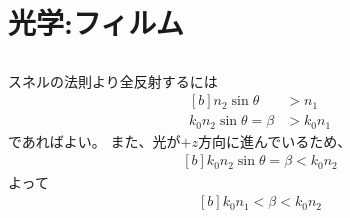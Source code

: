 \documentclass[../ap_2013.tex]{subfiles}
\begin{document}
\setcounter{chapter}{2}
\chapter{光学:フィルム}
\section{}
スネルの法則より全反射するには
\begin{equation}\begin{aligned}[b]
    n_2\sin\theta &> n_1\\
    k_0n_2\sin\theta = \beta &> k_0n_1
\end{aligned}\end{equation}
であればよい。
また、光が\(+z\)方向に進んでいるため、
\begin{equation}\begin{aligned}[b]
    k_0n_2\sin\theta =\beta < k_0n_2
\end{aligned}\end{equation}
よって
\begin{equation}\begin{aligned}[b]
    k_0n_1< \beta < k_0n_2
\end{aligned}\end{equation}
\end{document}
